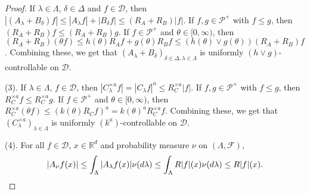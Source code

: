\documentclass[12pt,a4paper]{amsart}
\theoremstyle{plain}
\theoremstyle{definition}
\numberwithin{equation}{section}
\begin{document}
\begin{proof}
  If $\lambda \in \Lambda$, $\delta \in \Delta$ and $f\in \mathcal D$, then $|(A_\lambda + B_\delta) f| \leq |A_\lambda f| + |B_\delta f| \leq (R_A + R_B) |f|$.
  If $f,g \in \mathcal P^+$ with $f\leq g$, then $(R_A + R_B)f \leq (R_A + R_B) g$.
  If $f \in \mathcal P^+$ and $\theta \in [0,\infty)$, then $(R_A + R_B) (\theta f) \leq h(\theta) R_Af + g(\theta) R_Bf \leq (h(\theta) \vee g(\theta)) (R_A+R_B)f $.
  Combining these, we get that $(A_\lambda + B_\delta)_{\delta\in \Delta, \lambda \in \Lambda}$ is uniformly $(h \vee g)$-controllable on $\mathcal D$.
  
  (3). 
  If $\lambda \in \Lambda$, $f\in \mathcal D$, then $|C_\lambda^{\times a} f| = |C_\lambda f|^a  \leq R_C^{\times a} |f|$.
  If $f,g \in \mathcal P^+$ with $f\leq g$, then $R_C^{\times a}f \leq R_C^{\times a} g$.
  If $f \in \mathcal P^+$ and $\theta \in [0,\infty)$, then $R_C^{\times a}(\theta f) \leq (k(\theta) R_C f)^a = k(\theta)^a R_C^{\times a}f$.
  Combining these, we get that $(C_\lambda^{\times a})_{\lambda \in \Lambda}$ is uniformly $(k^a)$-controllable on $\mathcal D$.
  
  (4).     
  For all $f \in \mathcal{D}$, $x\in \mathbb R^d$ and  probability measure $\nu$ on $(\Lambda, \mathscr F)$,
  \[
    | A_{\nu}f(x) | 
    \leq \int_{\Lambda} | A_{\lambda}f(x) | \nu(d\lambda) 
    \leq \int_{\Lambda}R|f|(x)\nu(d\lambda) \leq R|f|(x). 
    \qedhere
  \]
\end{proof}
\end{document}
